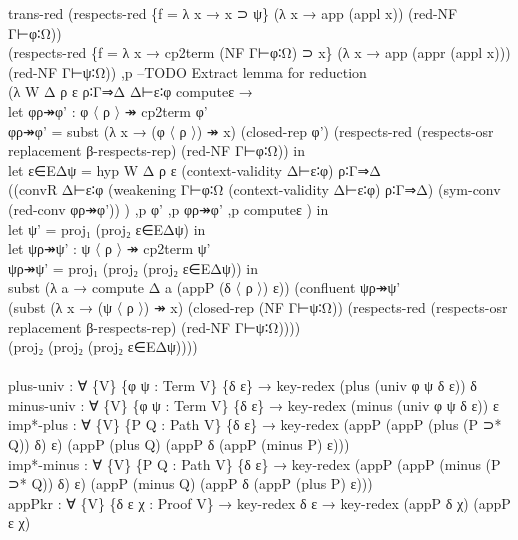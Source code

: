 {\begin{code}
{\>                      trans-red (respects-red \{f = λ x → x ⊃ ψ\} (λ x → app (appl x)) (red-NF Γ⊢φ∶Ω)) \<\\
\>                                (respects-red \{f = λ x → cp2term (NF Γ⊢φ∶Ω) ⊃ x\} (λ x → app (appr (appl x))) (red-NF Γ⊢ψ∶Ω)) ,p  --TODO Extract lemma for reduction\<\\
\>                      (λ W Δ ρ ε ρ∶Γ⇒Δ Δ⊢ε∶φ computeε →\<\\
\>                      let φρ↠φ' : φ 〈 ρ 〉 ↠ cp2term φ'\<\\
\>                          φρ↠φ' = subst (λ x → (φ 〈 ρ 〉) ↠ x) (closed-rep φ') (respects-red (respects-osr replacement β-respects-rep) (red-NF Γ⊢φ∶Ω)) in\<\\
\>                      let ε∈EΔψ = hyp W Δ ρ ε (context-validity Δ⊢ε∶φ) ρ∶Γ⇒Δ        \<\\
\>                                  ((convR Δ⊢ε∶φ (weakening Γ⊢φ∶Ω (context-validity Δ⊢ε∶φ) ρ∶Γ⇒Δ) (sym-conv (red-conv φρ↠φ')) ) ,p φ' ,p φρ↠φ' ,p computeε ) in \<\\
\>                      let ψ' = proj₁ (proj₂ ε∈EΔψ) in \<\\
\>                      let ψρ↠ψ' : ψ 〈 ρ 〉 ↠ cp2term ψ'\<\\
\>                          ψρ↠ψ' = proj₁ (proj₂ (proj₂ ε∈EΔψ)) in \<\\
\>                      subst (λ a → compute Δ a (appP (δ 〈 ρ 〉) ε)) (confluent ψρ↠ψ' \<\\
\>                        (subst (λ x → (ψ 〈 ρ 〉) ↠ x) (closed-rep (NF Γ⊢ψ∶Ω)) (respects-red (respects-osr replacement β-respects-rep) (red-NF Γ⊢ψ∶Ω)))) \<\\
\>                        (proj₂ (proj₂ (proj₂ ε∈EΔψ))))\<\\
\>\<\\
\>  plus-univ : ∀ \{V\} \{φ ψ : Term V\} \{δ ε\} → key-redex (plus (univ φ ψ δ ε)) δ\<\\
\>  minus-univ : ∀ \{V\} \{φ ψ : Term V\} \{δ ε\} → key-redex (minus (univ φ ψ δ ε)) ε\<\\
\>  imp*-plus : ∀ \{V\} \{P Q : Path V\} \{δ ε\} → key-redex (appP (appP (plus (P ⊃* Q)) δ) ε) (appP (plus Q) (appP δ (appP (minus P) ε)))\<\\
\>  imp*-minus : ∀ \{V\} \{P Q : Path V\} \{δ ε\} → key-redex (appP (appP (minus (P ⊃* Q)) δ) ε) (appP (minus Q) (appP δ (appP (plus P) ε)))\<\\
\>  appPkr : ∀ \{V\} \{δ ε χ : Proof V\} → key-redex δ ε → key-redex (appP δ χ) (appP ε χ)\<\\
}
\end{code}}
